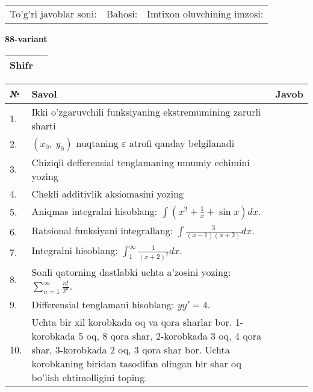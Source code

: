 \documentclass{article}
\begin{document}
  \vspace{1cm}
  
  \begin{tabular}{lll}
  To'g'ri javoblar soni: \underline{\hspace{1.5cm}} & 
  Bahosi: \underline{\hspace{1.5cm}} & 
  Imtixon oluvchining imzosi: \underline{\hspace{2cm}} \\
  \end{tabular}
  
  \egroup
  
  \newpage
  
  
  \textbf{88-variant}\\
  
  \bgroup
  \def\arraystretch{1.6} %
  
  \begin{tabular}{|m{5.7cm}|m{9.5cm}|}
  \hline
  Shifr & \\
  \hline
  \end{tabular}
  
  \vspace{1cm}
  
  \begin{tabular}{|m{0.7cm}|m{10cm}|m{4cm}|}
  \hline
  № & Savol & Javob \\
  \hline
  1. & Ikki o'zgaruvchili funksiyaning ekstremumining zarurli sharti &  \\
  \hline
  2. & \((x_{0},\ y_{0})\) nuqtaning \(\varepsilon\) atrofi qanday belgilanadi &  \\
  \hline
  3. & Chiziqli defferensial tenglamaning umumiy echimini yozing &  \\
  \hline
  4. & Chekli additivlik aksiomasini yozing &  \\
  \hline
  5. & Aniqmas integralni hisoblang: \(\int {\left( x^{2} + \frac{1}{x} + \sin x \right)dx}\). &  \\
  \hline
  6. & Ratsional funksiyani integrallang: \(\int {\frac{3}{(x - 1)(x + 2)}dx}\). &  \\
  \hline
  7. & Integralni hisoblang: \(\int_{1}^{\infty}{\frac{1}{(x + 2)^{2}}dx}\). &  \\
  \hline
  8. & Sonli qatorning dastlabki uchta a'zosini yozing: \(\sum_{n = 1}^{\infty}\frac{n!}{2^{n}}\). &  \\
  \hline
  9. & Differensial tenglamani hisoblang: \(yy' = 4\). &  \\
  \hline
  10. & Uchta bir xil korobkada oq va qora sharlar bor. 1-korobkada 5 oq, 8 qora shar, 2-korobkada 3 oq, 4 qora shar, 3-korobkada 2 oq, 3 qora shar bor. Uchta korobkaning biridan tasodifan olingan bir shar oq bo'lish ehtimolligini toping. &  \\
  \hline
  \end{tabular}
  
\end{document}
